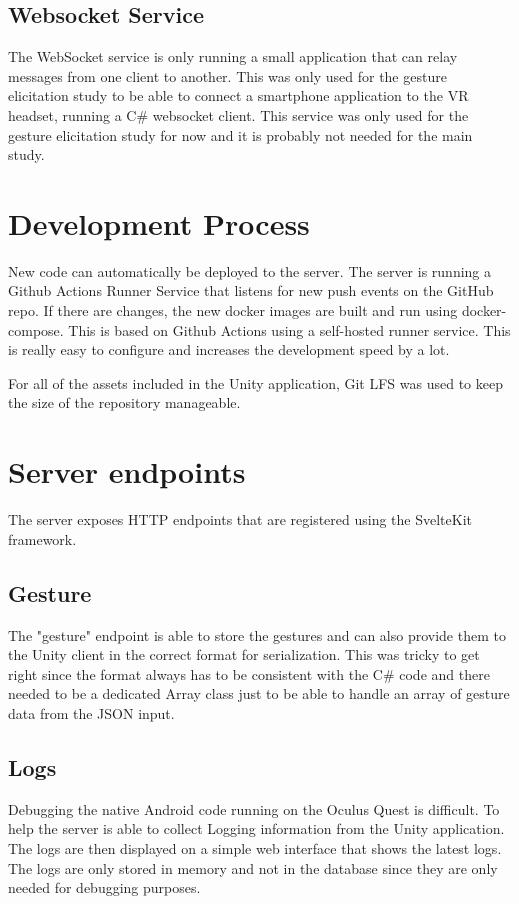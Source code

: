 \subsection{Websocket Service}
The WebSocket service is only running a small application that can relay messages from one client to another. This was only used for the gesture elicitation study to be able to connect a smartphone application to the VR headset, running a C\# websocket client. This service was only used for the gesture elicitation study for now and it is probably not needed for the main study.


\section{Development Process}
New code can automatically be deployed to the server. The server is running a Github Actions Runner Service that listens for new push events on the GitHub repo. If there are changes, the new docker images are built and run using docker-compose. This is based on Github Actions using a self-hosted runner service. This is really easy to configure and increases the development speed by a lot. 

For all of the assets included in the Unity application, Git LFS was used to keep the size of the repository manageable.


\section{Server endpoints}
The server exposes HTTP endpoints that are registered using the SvelteKit framework.

\subsection{Gesture}
The "gesture" endpoint is able to store the gestures and can also provide them to the Unity client in the correct format for serialization. This was tricky to get right since the format always has to be consistent with the C\# code and there needed to be a dedicated Array class just to be able to handle an array of gesture data from the JSON input.

\subsection{Logs}
Debugging the native Android code running on the Oculus Quest is difficult. To help the server is able to collect Logging information from the Unity application. The logs are then displayed on a simple web interface that shows the latest logs. The logs are only stored in memory and not in the database since they are only needed for debugging purposes. 

